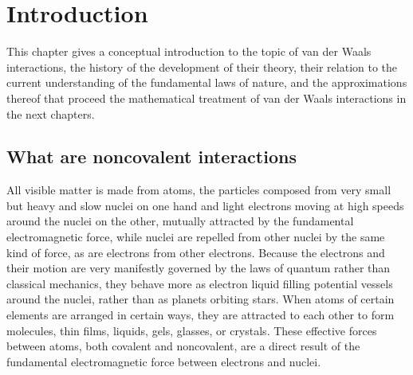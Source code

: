 \chapter{Introduction}\label{chap:intro}

{\sffamily This chapter gives a conceptual introduction to the topic of van der Waals interactions, the history of the development of their theory, their relation to the current understanding of the fundamental laws of nature, and the approximations thereof that proceed the mathematical treatment of van der Waals interactions in the next chapters.}

\section{What are noncovalent interactions}

All visible matter is made from atoms, the particles composed from very small but heavy and slow nuclei on one hand and light electrons moving at high speeds around the nuclei on the other, mutually attracted by the fundamental electromagnetic force, while nuclei are repelled from other nuclei by the same kind of force, as are electrons from other electrons.
Because the electrons and their motion are very manifestly governed by the laws of quantum rather than classical mechanics, they behave more as electron liquid filling potential vessels around the nuclei, rather than as planets orbiting stars.
When atoms of certain elements are arranged in certain ways, they are attracted to each other to form molecules, thin films, liquids, gels, glasses, or crystals.
These effective forces between atoms, both covalent and noncovalent, are a direct result of the fundamental electromagnetic force between electrons and nuclei.


